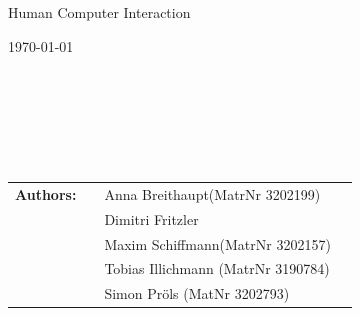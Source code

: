 \begin{center}
	\Large{Human Computer Interaction}
\end{center}
\begin{center}

\end{center}
\begin{center}
{\large \today\par}
\end{center}
\begin{verbatim}






\end{verbatim}
\begin{flushleft}
\begin{tabular}{llll}
\textbf{Authors:} & & Anna Breithaupt(MatrNr 3202199)\\  &&Dimitri Fritzler\\ &&Maxim Schiffmann(MatrNr 3202157)\\ &&Tobias Illichmann (MatrNr 3190784)\\ &&Simon Pröls (MatNr 3202793)
\end{tabular}
\end{flushleft}




